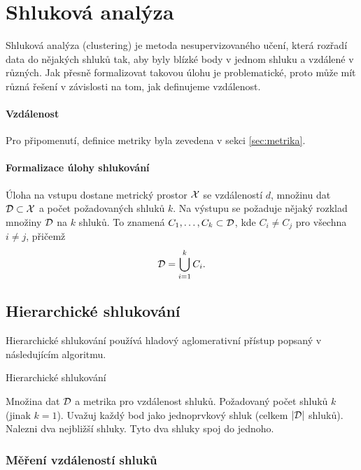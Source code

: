 \section{Shluková analýza}

Shluková analýza (clustering) je metoda nesupervizovaného učení, která rozřadí data do nějakých shluků tak, aby byly blízké body v jednom shluku a vzdálené v různých. Jak přesně formalizovat takovou úlohu je problematické, proto může mít různá řešení v závislosti na tom, jak definujeme vzdálenost.

\paragraph{Vzdálenost} Pro připomenutí, definice metriky byla zevedena v sekci \ref{sec:metrika}.

\paragraph{Formalizace úlohy shlukování} Úloha na vstupu dostane metrický prostor $\mathcal{X}$ se vzdáleností $d$, množinu dat $\mathcal{D} \subset \mathcal{X}$ a počet požadovaných shluků $k$. Na výstupu se požaduje nějaký rozklad množiny $\mathcal{D}$ na $k$ shluků. To znamená $C_1, \ldots, C_k \subset \mathcal{D}$, kde $C_i \neq C_j$ pro všechna $i \neq j$, přičemž \[\mathcal{D} = \bigcup_{i=1}^{k} C_i.\]

\subsection{Hierarchické shlukování}

Hierarchické shlukování používá hladový aglomerativní přístup popsaný v následujícím algoritmu.

\begin{algorithm}[H]
    \renewcommand{\thealgorithm}{}
    \caption{Hierarchické shlukování}
    \begin{algorithmic}[1]
        \Require
        \Statex Množina dat $\mathcal{D}$ a metrika pro vzdálenost shluků.
        \Statex Požadovaný počet shluků $k$ (jinak $k=1$).
        \Statex
        \State Uvažuj každý bod jako jednoprvkový shluk (celkem $|\mathcal{D}|$ shluků).
        \State Nalezni dva nejbližší shluky.
        \State Tyto dva shluky spoj do jednoho.
        \EndWhile
    \end{algorithmic}
\end{algorithm}

\subsubsection{Měření vzdáleností shluků}

